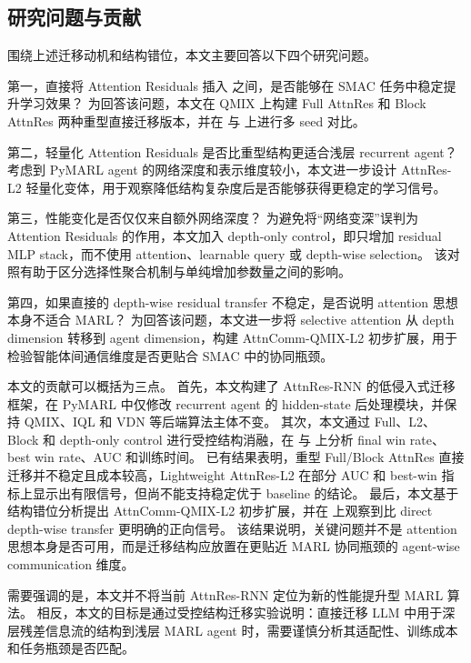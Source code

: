 \subsection{研究问题与贡献}

围绕上述迁移动机和结构错位，本文主要回答以下四个研究问题。

第一，直接将 Attention Residuals 插入  之间，是否能够在 SMAC 任务中稳定提升学习效果？
为回答该问题，本文在 QMIX 上构建 Full AttnRes 和 Block AttnRes 两种重型直接迁移版本，并在  与  上进行多 seed 对比。

第二，轻量化 Attention Residuals 是否比重型结构更适合浅层 recurrent agent？
考虑到 PyMARL agent 的网络深度和表示维度较小，本文进一步设计 AttnRes-L2 轻量化变体，用于观察降低结构复杂度后是否能够获得更稳定的学习信号。

第三，性能变化是否仅仅来自额外网络深度？
为避免将“网络变深”误判为 Attention Residuals 的作用，本文加入 depth-only control，即只增加 residual MLP stack，而不使用 attention、learnable query 或 depth-wise selection。
该对照有助于区分选择性聚合机制与单纯增加参数量之间的影响。

第四，如果直接的 depth-wise residual transfer 不稳定，是否说明 attention 思想本身不适合 MARL？
为回答该问题，本文进一步将 selective attention 从 depth dimension 转移到 agent dimension，构建 AttnComm-QMIX-L2 初步扩展，用于检验智能体间通信维度是否更贴合 SMAC 中的协同瓶颈。

本文的贡献可以概括为三点。
首先，本文构建了 AttnRes-RNN 的低侵入式迁移框架，在 PyMARL 中仅修改 recurrent agent 的 hidden-state 后处理模块，并保持 QMIX、IQL 和 VDN 等后端算法主体不变。
其次，本文通过 Full、L2、Block 和 depth-only control 进行受控结构消融，在  与  上分析 final win rate、best win rate、AUC 和训练时间。
已有结果表明，重型 Full/Block AttnRes 直接迁移并不稳定且成本较高，Lightweight AttnRes-L2 在部分 AUC 和 best-win 指标上显示出有限信号，但尚不能支持稳定优于 baseline 的结论。
最后，本文基于结构错位分析提出 AttnComm-QMIX-L2 初步扩展，并在  上观察到比 direct depth-wise transfer 更明确的正向信号。
该结果说明，关键问题并不是 attention 思想本身是否可用，而是迁移结构应放置在更贴近 MARL 协同瓶颈的 agent-wise communication 维度。

需要强调的是，本文并不将当前 AttnRes-RNN 定位为新的性能提升型 MARL 算法。
相反，本文的目标是通过受控结构迁移实验说明：直接迁移 LLM 中用于深层残差信息流的结构到浅层 MARL agent 时，需要谨慎分析其适配性、训练成本和任务瓶颈是否匹配。
